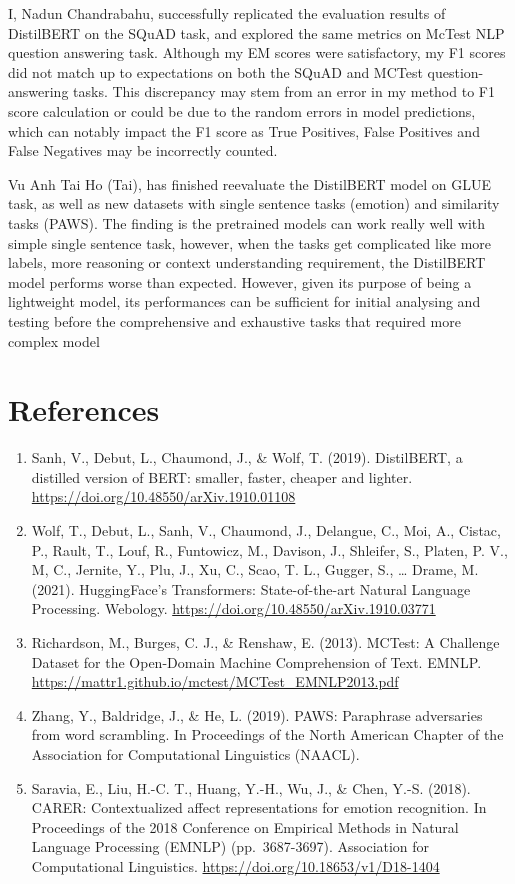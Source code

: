 \documentclass[
  11pt,
]{article}
\begin{document}
I, Nadun Chandrabahu, successfully replicated the evaluation results of
DistilBERT on the SQuAD task, and explored the same metrics on McTest
NLP question answering task. Although my EM scores were satisfactory, my
F1 scores did not match up to expectations on both the SQuAD and MCTest
question-answering tasks. This discrepancy may stem from an error in my
method to F1 score calculation or could be due to the random errors in
model predictions, which can notably impact the F1 score as True
Positives, False Positives and False Negatives may be incorrectly
counted.

Vu Anh Tai Ho (Tai), has finished reevaluate the DistilBERT model on
GLUE task, as well as new datasets with single sentence tasks (emotion)
and similarity tasks (PAWS). The finding is the pretrained models can
work really well with simple single sentence task, however, when the
tasks get complicated like more labels, more reasoning or context
understanding requirement, the DistilBERT model performs worse than
expected. However, given its purpose of being a lightweight model, its
performances can be sufficient for initial analysing and testing before
the comprehensive and exhaustive tasks that required more complex model

\section{References}\label{references}

\begin{enumerate}
\def\labelenumi{\arabic{enumi}.}
\item
  Sanh, V., Debut, L., Chaumond, J., \& Wolf, T. (2019). DistilBERT, a
  distilled version of BERT: smaller, faster, cheaper and lighter.
  \url{https://doi.org/10.48550/arXiv.1910.01108}
\item
  Wolf, T., Debut, L., Sanh, V., Chaumond, J., Delangue, C., Moi, A.,
  Cistac, P., Rault, T., Louf, R., Funtowicz, M., Davison, J., Shleifer,
  S., Platen, P. V., M, C., Jernite, Y., Plu, J., Xu, C., Scao, T. L.,
  Gugger, S., \ldots{} Drame, M. (2021). HuggingFace's Transformers:
  State-of-the-art Natural Language Processing. Webology.
  \url{https://doi.org/10.48550/arXiv.1910.03771}
\item
  Richardson, M., Burges, C. J., \& Renshaw, E. (2013). MCTest: A
  Challenge Dataset for the Open-Domain Machine Comprehension of Text.
  EMNLP. \url{https://mattr1.github.io/mctest/MCTest_EMNLP2013.pdf}
\item
  Zhang, Y., Baldridge, J., \& He, L. (2019). PAWS: Paraphrase
  adversaries from word scrambling. In Proceedings of the North American
  Chapter of the Association for Computational Linguistics (NAACL).
\item
  Saravia, E., Liu, H.-C. T., Huang, Y.-H., Wu, J., \& Chen, Y.-S.
  (2018). CARER: Contextualized affect representations for emotion
  recognition. In Proceedings of the 2018 Conference on Empirical
  Methods in Natural Language Processing (EMNLP) (pp.~3687-3697).
  Association for Computational Linguistics.
  \url{https://doi.org/10.18653/v1/D18-1404}
\end{enumerate}
\end{document}
